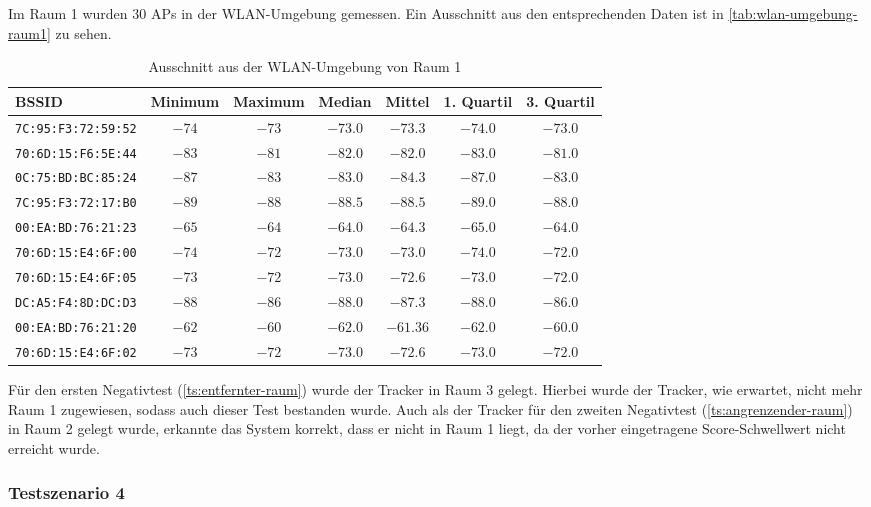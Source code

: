 Im Raum 1 wurden $30$ \glspl{AP} in der \gls{WLAN}-Umgebung gemessen. Ein Ausschnitt aus den
entsprechenden Daten ist in \autoref{tab:wlan-umgebung-raum1} zu sehen.

\begin{table}[htbp]
	\def\arraystretch{1.1}
	\centering
	\begin{tabular}{l c c c c c c}
		\gls{BSSID}	 & Minimum & Maximum & Median & Mittel & 1. Quartil & 3. Quartil \\ \hline
		\texttt{7C:95:F3:72:59:52} & $-74$     & $-73$     & $-73.0$  & $-73.3$  & $-74.0$ & $-73.0$ \\
		\texttt{70:6D:15:F6:5E:44} & $-83$     & $-81$     & $-82.0$  & $-82.0$  & $-83.0$ & $-81.0$ \\
		\texttt{0C:75:BD:BC:85:24} & $-87$     & $-83$     & $-83.0$  & $-84.3$  & $-87.0$ & $-83.0$ \\
		\texttt{7C:95:F3:72:17:B0} & $-89$     & $-88$     & $-88.5$  & $-88.5$  & $-89.0$ & $-88.0$ \\
		\texttt{00:EA:BD:76:21:23} & $-65$     & $-64$     & $-64.0$  & $-64.3$  & $-65.0$ & $-64.0$ \\
		\texttt{70:6D:15:E4:6F:00} & $-74$     & $-72$     & $-73.0$  & $-73.0$  & $-74.0$ & $-72.0$ \\
		\texttt{70:6D:15:E4:6F:05} & $-73$     & $-72$     & $-73.0$  & $-72.6$  & $-73.0$ & $-72.0$ \\
		\texttt{DC:A5:F4:8D:DC:D3} & $-88$     & $-86$     & $-88.0$  & $-87.3$  & $-88.0$ & $-86.0$ \\
		\texttt{00:EA:BD:76:21:20} & $-62$     & $-60$     & $-62.0$  & $-61.36$ & $-62.0$ & $-60.0$ \\
		\texttt{70:6D:15:E4:6F:02} & $-73$     & $-72$     & $-73.0$  & $-72.6$  & $-73.0$ & $-72.0$ \\
	\end{tabular}
	\caption{Ausschnitt aus der \gls{WLAN}-Umgebung von Raum 1}
	\label{tab:wlan-umgebung-raum1}
\end{table}

Für den ersten Negativtest (\ref{ts:entfernter-raum}) wurde der Tracker in Raum 3 gelegt. Hierbei
wurde der Tracker, wie
erwartet, nicht mehr Raum 1 zugewiesen, sodass auch dieser Test bestanden wurde. Auch als der
Tracker für den zweiten Negativtest (\ref{ts:angrenzender-raum}) in Raum 2 gelegt wurde, erkannte
das System korrekt, dass er nicht in Raum 1 liegt, da der vorher eingetragene Score-Schwellwert
nicht erreicht wurde.

\subsubsection{Testszenario 4}

